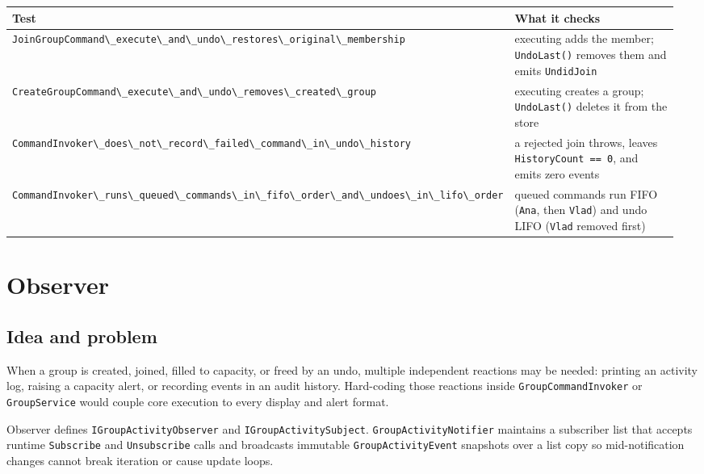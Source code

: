 \documentclass{utmreport}
\providecommand{\passthrough}[1]{#1}
\newcounter{none}
\begin{document}
{\def\LTcaptype{none} %
\begin{longtable}[]{@{}>{\raggedright\arraybackslash}p{0.480\linewidth}>{\raggedright\arraybackslash}p{0.480\linewidth}@{}}
\toprule\noalign{}
Test & What it checks \\
\midrule\noalign{}
\endhead
\bottomrule\noalign{}
\endlastfoot
\passthrough{\lstinline!JoinGroupCommand\_execute\_and\_undo\_restores\_original\_membership!} & executing adds the member; \passthrough{\lstinline!UndoLast()!} removes them and emits \passthrough{\lstinline!UndidJoin!} \\
\passthrough{\lstinline!CreateGroupCommand\_execute\_and\_undo\_removes\_created\_group!} & executing creates a group; \passthrough{\lstinline!UndoLast()!} deletes it from the store \\
\passthrough{\lstinline!CommandInvoker\_does\_not\_record\_failed\_command\_in\_undo\_history!} & a rejected join throws, leaves \passthrough{\lstinline!HistoryCount == 0!}, and emits zero events \\
\passthrough{\lstinline!CommandInvoker\_runs\_queued\_commands\_in\_fifo\_order\_and\_undoes\_in\_lifo\_order!} & queued commands run FIFO (\passthrough{\lstinline!Ana!}, then \passthrough{\lstinline!Vlad!}) and undo LIFO (\passthrough{\lstinline!Vlad!} removed first) \\
\end{longtable}
}

\chapter{Observer}

\section{Idea and problem}

When a group is created, joined, filled to capacity, or freed by an undo, multiple independent reactions may be needed: printing an activity log, raising a capacity alert, or recording events in an audit history. Hard-coding those reactions inside \passthrough{\lstinline!GroupCommandInvoker!} or \passthrough{\lstinline!GroupService!} would couple core execution to every display and alert format.

Observer defines \passthrough{\lstinline!IGroupActivityObserver!} and \passthrough{\lstinline!IGroupActivitySubject!}. \passthrough{\lstinline!GroupActivityNotifier!} maintains a subscriber list that accepts runtime \passthrough{\lstinline!Subscribe!} and \passthrough{\lstinline!Unsubscribe!} calls and broadcasts immutable \passthrough{\lstinline!GroupActivityEvent!} snapshots over a list copy so mid-notification changes cannot break iteration or cause update loops.
\end{document}
